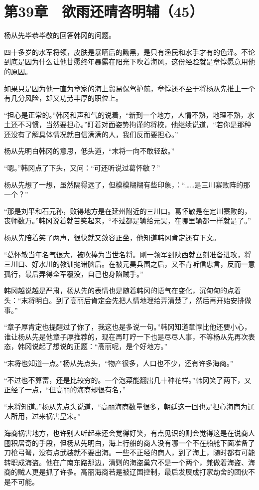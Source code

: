 \section{第39章　欲雨还晴咨明辅（45）}

杨从先毕恭毕敬的回答韩冈的问题。

四十多岁的水军将领，皮肤是暴晒后的黝黑，是只有渔民和水手才有的色泽。不论到底是因为什么让他甘愿终年暴露在阳光下吹着海风，这份经验就是章惇愿意用他的原因。

如果只是因为他一直为章家的海上贸易保驾护航，章惇还不至于将杨从先推上一个有几分风险，却又功劳丰厚的职位上。

“担心是正常的。”韩冈和声和气的说着，“新到一个地方，人情不熟，地理不熟，水土还不习惯，当然要担心。”盯着对面姿势拘谨的将校，他继续说道，“若你是那种还没有了解具体情况就自信满满的人，我们反而要担心。”

杨从先明白韩冈的意思，低头道，“末将一向不敢轻敌。”

“嗯。”韩冈点了下头，又问：“可还听说过葛怀敏？”

杨从先想了一想，虽然隔得远了，但模模糊糊有些印象，：“……是三川寨败阵的那一个？”

“那是刘平和石元孙，败得地方是在延州附近的三川口。葛怀敏是在定川寨败的，丧师数万。”韩冈说着就苦笑起来，“不过都是输给元昊，在哪里输都一样就是了。”

杨从先陪着笑了两声，很快就又敛容正坐，他知道韩冈肯定还有下文。

“葛怀敏当年名气很大，被吹捧为当世名将。刚一领军到陕西就立刻准备进攻，将三川口、好水川的教训抛诸脑后。在被元昊兵围之后，又不肯听信忠言，反而一意孤行，最后弄得全军覆没，自己也身陷贼手。”

韩冈越说越是严肃，杨从先的表情也是随着韩冈的语气在变化，沉甸甸的点着头：“末将明白。到了高丽后肯定会先把人情地理给弄清楚了，然后再开始安排做事。”

“章子厚肯定也提醒过了你了，我这也是多说一句。”韩冈知道章惇比他还要小心，谁让杨从先是他章子厚推荐的，现在再叮咛一下也是尽尽人事，不等杨从先再次表态，韩冈说起了想说的正题：“高丽呢，是个好地方。”

“末将也知道一点。”杨从先点头，“物产很多，人口也不少，还有许多海商。”

“不过也不算富，还是比较穷的。一个泡菜能翻出几十种花样。”韩冈笑了两下，又正经了一点，“但高丽的海商却很有名，”

“末将知道。”杨从先点头说道，“高丽海商数量很多，朝廷这一回也是担心海商为辽人所用，过来祸害皇宋。”

海商祸害地方，也许别人听起来还会觉得好笑，有点见识的则会觉得这是在说商人囤积居奇的手段，但杨从先明白，海上行船的商人没有哪一个不在船舱下面准备了刀枪弓弩，没有点武装就不要出海。一些不正经的商人，到了海上，随时都有可能转职成海盗。他在广南东路那边，清剿的海盗巢穴不是一个两个，兼做着海盗、海商的贼人更是抓了许多。高丽海商若是被辽国控制，最后发展成打家劫舍的团伙不是不可能。

